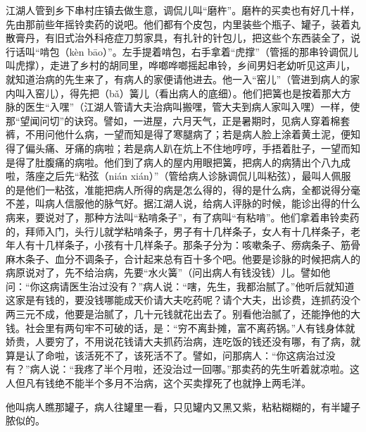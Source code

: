 \documentclass[12pt,UTF8]{ctexbook}
\begin{document}
江湖人管到乡下串村庄镇去做生意，调侃儿叫“磨杵”。磨杵的买卖也有好几十样，先由那前些年摇铃卖药的说吧。他们都有个皮包，内里装些个瓶子、罐子，装着丸散膏丹，有旧式治外科疮症刀剪家具，有扎针的针包儿，把这些个东西装全了，说行话叫“啃包（kèn bāo）”。左手提着啃包，右手拿着“虎撑”（管摇的那串铃调侃儿叫虎撑），走进了乡村的胡同里，哗啷哗啷摇起串铃，乡间男妇老幼听见这声儿，就知道治病的先生来了，有病人的家便请他进去。他一入“窑儿”（管进到病人的家内叫入窑儿），得先把（bǎ）簧儿（看出病人的底细）。他们把簧也是按着那大方脉的医生“入嘿”（江湖人管请大夫治病叫搬嘿，管大夫到病人家叫入嘿）一样，使那“望闻问切”的诀窍。譬如，一进屋，六月天气，正是暑期时，见病人穿着棉套裤，不用问他什么病，一望而知是得了寒腿病了；若是病人脸上涂着黄土泥，便知得了偏头痛、牙痛的病啦；若是病人趴在炕上不住地哼哼，手捂着肚子，一望而知是得了肚腹痛的病啦。他们到了病人的屋内用眼把簧，把病人的病猜出个八九成啦，落座之后先“粘弦（nián xián）”（管给病人诊脉调侃儿叫粘弦），最叫人佩服的是他们一粘弦，准能把病人所得的病是怎么得的，得的是什么病，全都说得分毫不差，叫病人信服他的脉气好。据江湖人说，给病人评脉的时候，能诊出得的什么病来，要说对了，那种方法叫“粘啃条子”，有了病叫“有粘啃”。他们拿着串铃卖药的，拜师入门，头行儿就学粘啃条子，男子有十几样条子，女人有十几样条子，老年人有十几样条子，小孩有十几样条子。那条子分为：咳嗽条子、痨病条子、筋骨麻木条子、血分不调条子，合计起来总有百十多个吧。他要是诊脉的时候把病人的病原说对了，先不给治病，先要“水火簧”（问出病人有钱没钱）儿。譬如他问：“你这病请医生治过没有？”病人说：“嗐，先生，我都治腻了。”他听后就知道这家是有钱的，要没钱哪能成天价请大夫吃药呢？请个大夫，出诊费，连抓药没个两三元不成，他要是治腻了，几十元钱就花出去了。别看他治腻了，还能挣他的大钱。社会里有两句牢不可破的话，是：“穷不离卦摊，富不离药锅。”人有钱身体就娇贵，人要穷了，不用说花钱请大夫抓药治病，连吃饭的钱还没有哪，有了病，就算是认了命啦，该活死不了，该死活不了。譬如，问那病人：“你这病治过没有？”病人说：“我疼了半个月啦，还没治过一回哪。”那卖药的先生听着就凉啦。这人但凡有钱绝不能半个多月不治病，这个买卖撑死了也就挣上两毛洋。

他叫病人瞧那罐子，病人往罐里一看，只见罐内又黑又紫，粘粘糊糊的，有半罐子脓似的。
\end{document}
